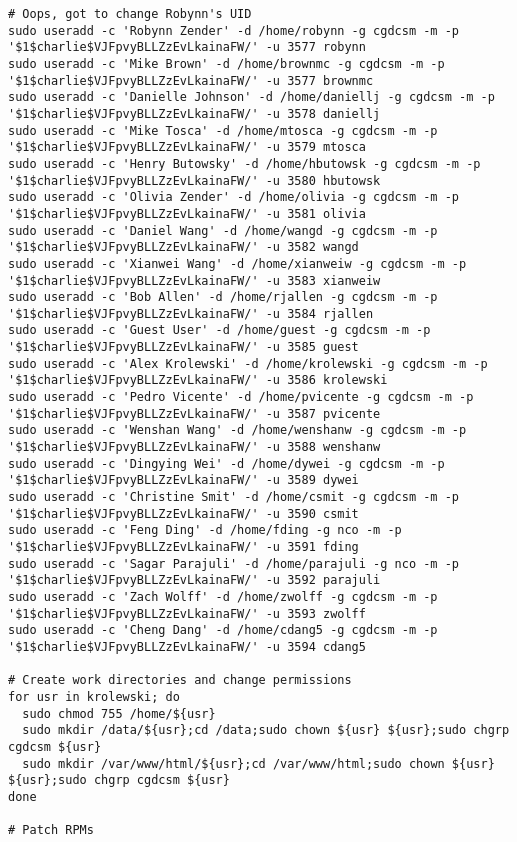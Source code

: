 \documentclass[12pt,twoside]{article}
\begin{document}
\begin{verbatim}
# Oops, got to change Robynn's UID
sudo useradd -c 'Robynn Zender' -d /home/robynn -g cgdcsm -m -p '$1$charlie$VJFpvyBLLZzEvLkainaFW/' -u 3577 robynn
sudo useradd -c 'Mike Brown' -d /home/brownmc -g cgdcsm -m -p '$1$charlie$VJFpvyBLLZzEvLkainaFW/' -u 3577 brownmc
sudo useradd -c 'Danielle Johnson' -d /home/daniellj -g cgdcsm -m -p '$1$charlie$VJFpvyBLLZzEvLkainaFW/' -u 3578 daniellj
sudo useradd -c 'Mike Tosca' -d /home/mtosca -g cgdcsm -m -p '$1$charlie$VJFpvyBLLZzEvLkainaFW/' -u 3579 mtosca
sudo useradd -c 'Henry Butowsky' -d /home/hbutowsk -g cgdcsm -m -p '$1$charlie$VJFpvyBLLZzEvLkainaFW/' -u 3580 hbutowsk
sudo useradd -c 'Olivia Zender' -d /home/olivia -g cgdcsm -m -p '$1$charlie$VJFpvyBLLZzEvLkainaFW/' -u 3581 olivia
sudo useradd -c 'Daniel Wang' -d /home/wangd -g cgdcsm -m -p '$1$charlie$VJFpvyBLLZzEvLkainaFW/' -u 3582 wangd
sudo useradd -c 'Xianwei Wang' -d /home/xianweiw -g cgdcsm -m -p '$1$charlie$VJFpvyBLLZzEvLkainaFW/' -u 3583 xianweiw
sudo useradd -c 'Bob Allen' -d /home/rjallen -g cgdcsm -m -p '$1$charlie$VJFpvyBLLZzEvLkainaFW/' -u 3584 rjallen
sudo useradd -c 'Guest User' -d /home/guest -g cgdcsm -m -p '$1$charlie$VJFpvyBLLZzEvLkainaFW/' -u 3585 guest
sudo useradd -c 'Alex Krolewski' -d /home/krolewski -g cgdcsm -m -p '$1$charlie$VJFpvyBLLZzEvLkainaFW/' -u 3586 krolewski
sudo useradd -c 'Pedro Vicente' -d /home/pvicente -g cgdcsm -m -p '$1$charlie$VJFpvyBLLZzEvLkainaFW/' -u 3587 pvicente
sudo useradd -c 'Wenshan Wang' -d /home/wenshanw -g cgdcsm -m -p '$1$charlie$VJFpvyBLLZzEvLkainaFW/' -u 3588 wenshanw
sudo useradd -c 'Dingying Wei' -d /home/dywei -g cgdcsm -m -p '$1$charlie$VJFpvyBLLZzEvLkainaFW/' -u 3589 dywei
sudo useradd -c 'Christine Smit' -d /home/csmit -g cgdcsm -m -p '$1$charlie$VJFpvyBLLZzEvLkainaFW/' -u 3590 csmit
sudo useradd -c 'Feng Ding' -d /home/fding -g nco -m -p '$1$charlie$VJFpvyBLLZzEvLkainaFW/' -u 3591 fding
sudo useradd -c 'Sagar Parajuli' -d /home/parajuli -g nco -m -p '$1$charlie$VJFpvyBLLZzEvLkainaFW/' -u 3592 parajuli
sudo useradd -c 'Zach Wolff' -d /home/zwolff -g cgdcsm -m -p '$1$charlie$VJFpvyBLLZzEvLkainaFW/' -u 3593 zwolff
sudo useradd -c 'Cheng Dang' -d /home/cdang5 -g cgdcsm -m -p '$1$charlie$VJFpvyBLLZzEvLkainaFW/' -u 3594 cdang5

# Create work directories and change permissions 
for usr in krolewski; do
  sudo chmod 755 /home/${usr}
  sudo mkdir /data/${usr};cd /data;sudo chown ${usr} ${usr};sudo chgrp cgdcsm ${usr}
  sudo mkdir /var/www/html/${usr};cd /var/www/html;sudo chown ${usr} ${usr};sudo chgrp cgdcsm ${usr}
done

# Patch RPMs


\end{verbatim}
\end{document}

